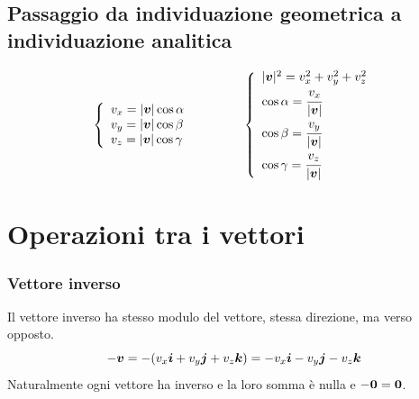 \subsection{Passaggio da individuazione geometrica a individuazione analitica}
\begin{equation*}
\left\{
\begin{array}{l}
v_x=|\boldsymbol{v}|\cos\alpha\\
v_y=|\boldsymbol{v}|\cos\beta\\
v_z=|\boldsymbol{v}|\cos\gamma
\end{array}
\right. \qquad \qquad \left\{
\begin{array}{l}
|\boldsymbol{v}|^2=v_x^2+v_y^2+v_z^2\\
\cos\alpha=\cfrac{v_x}{|\boldsymbol{v}|}\\
\cos\beta=\cfrac{v_y}{|\boldsymbol{v}|}\\
\cos\gamma=\cfrac{v_z}{|\boldsymbol{v}|}
\end{array}
\right.
\end{equation*}


\section{Operazioni tra i vettori}

\subsubsection{Vettore inverso}
Il vettore inverso ha stesso modulo del vettore, stessa direzione,
ma verso opposto.
$$-\boldsymbol{v}=-(v_x\boldsymbol{i}+v_y\boldsymbol{j}+v_z \boldsymbol{k})=-v_x\boldsymbol{i}-v_y\boldsymbol{j}-v_z\boldsymbol{k}$$
Naturalmente ogni vettore ha inverso e la loro somma è nulla e $-\boldsymbol{0}=\boldsymbol{0}$.

